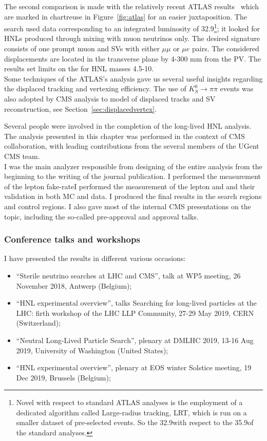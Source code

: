The second comparison is made with the relatively recent ATLAS
results~\cite{atlas_ll} which are marked in chartreuse in
Figure~\ref{fig:atlas} for an easier juxtaposition. The search used
data corresponding to an integrated
luminosity of 32.9\fbinv\footnote{Novel
with respect to standard ATLAS analyses is the employment of a
dedicated algorithm called Large-radius tracking, LRT, which is run on
a smaller dataset of pre-selected events. So the 32.9\fbinv with
respect to the 35.9\fbinv of the standard analyses.}; it looked for HNLs produced through mixing with
muon neutrinos only. The desired signature consists of one prompt muon and SVs
with either $\mu \mu$ or $\mu e$ pairs. The considered displacements
are located in the transverse plane by 4-300 mm from the PV. The
results set limits on the \mixparm for HNL masses 4.5-10\GeV.\\
Some techniques of the ATLAS's analysis gave us several useful
insights regarding the displaced tracking and vertexing
efficiency. The use of $K_S^{0} \rightarrow \pi \pi$ events was also
adopted by CMS analysis to model of displaced tracks
and SV reconstruction, see Section~\ref{sec:displacedvertex}.\\




\vspace{1.5cm}

Several people were involved in the completion of the long-lived HNL
analysis.\\
The analysis presented in this chapter was performed in the context of
CMS collaboration, with leading contributions from the several members
of the UGent CMS team.\\
I was the main analyzer responsible from designing of the entire analysis  from the beginning to the writing of the journal publication. I performed the measurement of the lepton fake-rateI performed the measurement of the
lepton \fr and \Dfr and their validation in both MC and data. I
produced the final results in the search regions and control
regions. I also
gave most of the internal CMS presentations on the topic, including the
so-called pre-approval and approval talks.
\subsubsection*{Conference talks and workshops}
I have presented the results in different various occasions:
\begin{itemize}
\item ``Sterile neutrino searches at LHC and CMS'', talk at WP5
  meeting, 26 November 2018, Antwerp (Belgium);
\item ``HNL experimental overview'', talks Searching for long-lived
  particles at the LHC: firth workshop of the LHC LLP Community, 27-29
  May 2019, CERN (Switzerland);
\item ``Neutral Long-Lived Particle Search'', plenary at DM\@ LHC 2019, 13-16 Aug 2019, University of Washington (United States);
\item ``HNL experimental overview'', plenary at EOS winter Solstice
  meeting, 19 Dec 2019, Brussels (Belgium);
\end{itemize}

